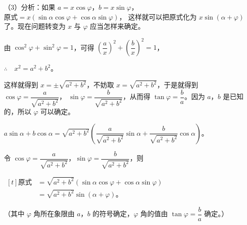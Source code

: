 （3）分析：如果 $a = x\cos\varphi$，$b = x\sin\varphi$，$\text{原式} = x(\sin\alpha \cos\varphi + \cos\alpha \sin\varphi)$，
这样就可以把原式化为 $x\sin(\alpha + \varphi)$ 了。现在问题转变为 $x$ 与 $\varphi$ 应当怎样来确定。

由 $\cos^2\varphi + \sin^2\varphi = 1$，可得 $\left( \dfrac{a}{x} \right)^2 + \left( \dfrac{b}{x} \right)^2 = 1$，\jiange

$\therefore \quad x^2 = a^2 + b^2$。

这样就得到 $x = \pm\sqrt{a^2 + b^2}$，不妨取 $x = \sqrt{a^2 + b^2}$，于是就得到 $\cos\varphi = \dfrac{a}{\sqrt{a^2 + b^2}}$，
$\sin\varphi = \dfrac{b}{\sqrt{a^2 + b^2}}$，从而得 $\tan\varphi = \dfrac{b}{a}$。因为 $a$，$b$ 是已知的，所以 $\varphi$ 可以确定。

$a\sin\alpha + b\cos\alpha = \sqrt{a^2 + b^2} \left( \dfrac{a}{\sqrt{a^2 + b^2}} \sin\alpha + \dfrac{b}{\sqrt{a^2 + b^2}} \cos\alpha \right)$。\jiange

令 $\cos\varphi = \dfrac{a}{\sqrt{a^2 + b^2}}$，$\sin\varphi = \dfrac{b}{\sqrt{a^2 + b^2}}$，则 \jiange

$\begin{aligned}[t]
    \text{原式} &= \sqrt{a^2 + b^2} (\sin\alpha \cos\varphi + \cos\alpha \sin\varphi) \\
    &= \sqrt{a^2 + b^2} \sin(\alpha + \varphi) \text{。}
\end{aligned}$

（其中 $\varphi$ 角所在象限由 $a$，$b$ 的符号确定，$\varphi$ 角的值由 $\tan\varphi = \dfrac{b}{a}$ 确定。）

